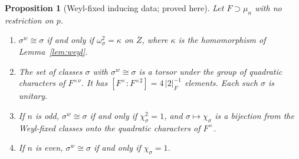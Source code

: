 \documentclass[12pt,letterpaper]{article}
\numberwithin{equation}{section}
\newtheorem{xproposition}[theorem]{Proposition}
\theoremstyle{definition}
\newcommand{\proved}{proved here}
\newcommand{\bZ}{\overline{Z}}
\begin{document}
\begin{xproposition}[Weyl-fixed inducing data; \proved]\label{prop:Wfixed}
Let $F\supset\mu_n$ with no restriction on $p$.
\begin{enumerate}[label=(\alph*),leftmargin=*,itemsep=1pt]
\item $\sigma^w\cong\sigma$ if and only if $\omega_\sigma^2=\kappa$ on $\bZ$, where $\kappa$
is the homomorphism of Lemma~\ref{lem:weyl}.
\item The set of classes $\sigma$ with $\sigma^w\cong\sigma$ is a torsor under the group of
quadratic characters of $F^{\times\nu}$.  It has $[F^\times:F^{\times2}]=4\,|2|_F^{-1}$
elements.  Each such $\sigma$ is unitary.
\item If $n$ is odd, $\sigma^w\cong\sigma$ if and only if $\chi_\sigma^2=1$, and
$\sigma\mapsto\chi_\sigma$ is a bijection from the Weyl-fixed classes onto the quadratic
characters of $F^\times$.
\item If $n$ is even, $\sigma^w\cong\sigma$ if and only if $\chi_\sigma=1$.
\end{enumerate}
\end{xproposition}
\end{document}
